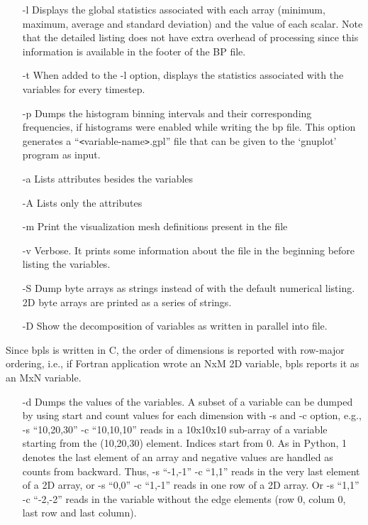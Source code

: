 \begin{itemize}
\item[-l]  Displays the global statistics associated with each array (minimum, maximum, 
average and standard deviation) and the value of each scalar. Note that the detailed 
listing does not have extra overhead of processing since this information is available 
in the footer of the BP file. 

\item[-t]  When added to the -l option, displays the statistics associated with the variables 
for every timestep. 

\item[-p] Dumps the histogram binning intervals and their corresponding frequencies, if 
histograms were enabled while writing the bp file. This option generates a ``\texttt{<}variable-name\texttt{>}.gpl'' 
file that can be given to the `gnuplot' program as input. 

\item[-a] Lists attributes besides the variables

\item[-A] Lists only the attributes

\item[-m] Print the visualization mesh definitions present in the file

%
%

\item[-v] Verbose. It prints some information about the file in the beginning before listing 
the variables. 

\item[-S] Dump byte arrays as strings instead of with the default numerical listing. 2D 
byte arrays are printed as a series of strings. 

\item[-D] Show the decomposition of variables as written in parallel into file. 
\end{itemize}

Since bpls is written in C, the order of dimensions is reported with row-major 
ordering, i.e., if Fortran application wrote an NxM 2D variable, bpls reports it 
as an MxN variable. 

\begin{itemize}
\item[-d] Dumps the values of the variables. A subset of a variable can be dumped by using 
start and count values for each dimension with -s and -c option, e.g., -s ``10,20,30'' 
-c ``10,10,10'' reads in a 10x10x10 sub-array of a variable starting from the (10,20,30) 
element. Indices start from 0. As in Python, \-{}1 denotes the last element of 
an array and negative values are handled as counts from backward. Thus, -s ``-1,-1'' 
-c ``1,1'' reads in the very last element of a 2D array, or -s ``0,0'' -c ``1,-1'' 
reads in one row of a 2D array. Or -s ``1,1'' -c ``-2,-2'' reads in the variable 
without the edge elements (row 0, colum 0, last row and last column).
\end{itemize}

